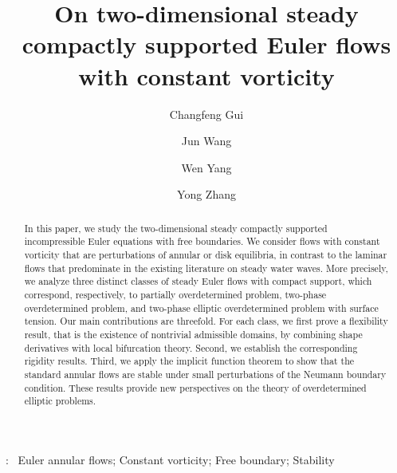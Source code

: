 \documentclass[reqno]{amsart}
\numberwithin{equation}{section}
\numberwithin{equation}{section}
\numberwithin{equation}{section}
\begin{document}
\title[steady compactly supported Euler flows with constant vorticity]{\Large On two-dimensional steady compactly supported Euler flows with constant vorticity}
	
\author[C.F. Gui]{Changfeng Gui}
\address{Changfeng Gui, Department of Mathematics, Faculty of Science and Technology, University of Macau, Macau, P.R. China}

\author[J. Wang]{Jun Wang}
\address{Jun Wang, School of Mathematical Sciences, Jiangsu University, Zhenjiang, Jiangsu, 212013, P.R. China}

	
\author[W. Yang]{Wen Yang}
\address{\noindent Wen ~Yang,~Department of Mathematics, Faculty of Science and Technology, University of Macau, Macau, P.R. China}
	
\author[Y. Zhang]{Yong Zhang}
\address{Yong Zhang, School of Mathematical Sciences, Jiangsu University, Zhenjiang, Jiangsu, 212013, P.R. China}

	

\begin{abstract}
In this paper, we study the two-dimensional steady compactly supported incompressible Euler equations with free boundaries. We consider flows with constant vorticity that are perturbations of annular or disk equilibria, in contrast to the laminar flows that predominate in the existing literature on steady water waves. More precisely, we analyze three distinct classes of steady Euler flows with compact support, which correspond, respectively, to partially overdetermined problem, two-phase overdetermined problem, and two-phase elliptic overdetermined problem with surface tension. Our main contributions are threefold. For each class, we first prove a flexibility result, that is the existence of nontrivial admissible domains, by combining shape derivatives with local bifurcation theory. Second, we establish the corresponding rigidity results. Third, we apply the implicit function theorem to show that the standard annular flows are stable under small perturbations of the Neumann boundary condition. These results provide new perspectives on the theory of overdetermined elliptic problems.
\end{abstract}


\maketitle
{}:~ Euler annular flows; Constant vorticity; Free boundary; Stability
\medskip
\end{document}
